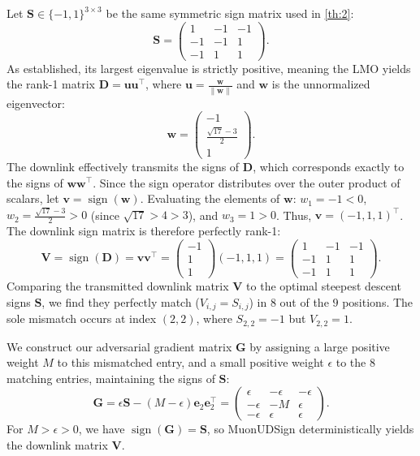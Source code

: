 \documentclass[letterpaper]{article} %
\begin{document}
Let $\mathbf{S} \in \{-1, 1\}^{3 \times 3}$ be the same symmetric sign matrix used in \cref{th:2}:
\begin{equation}
\mathbf{S} = \begin{pmatrix} 1 & -1 & -1 \\ -1 & -1 & 1 \\ -1 & 1 & 1 \end{pmatrix}.
\end{equation}
As established, its largest eigenvalue is strictly positive, meaning the LMO yields the rank-1 matrix $\mathbf{D} = \mathbf{u}\mathbf{u}^\top$, where $\mathbf{u} = \frac{\mathbf{w}}{\|\mathbf{w}\|}$ and $\mathbf{w}$ is the unnormalized eigenvector:
\begin{equation}
\mathbf{w} = \begin{pmatrix} -1 \\ \frac{\sqrt{17}-3}{2} \\ 1 \end{pmatrix}.
\end{equation}
The downlink effectively transmits the signs of $\mathbf{D}$, which corresponds exactly to the signs of $\mathbf{w}\mathbf{w}^\top$. Since the sign operator distributes over the outer product of scalars, let $\mathbf{v} = \operatorname{sign}(\mathbf{w})$.
Evaluating the elements of $\mathbf{w}$: $w_1 = -1 < 0$, $w_2 = \frac{\sqrt{17}-3}{2} > 0$ (since $\sqrt{17} > 4 > 3$), and $w_3 = 1 > 0$. Thus, $\mathbf{v} = (-1, 1, 1)^\top$.
The downlink sign matrix is therefore perfectly rank-1:
\begin{equation}
\mathbf{V} = \operatorname{sign}(\mathbf{D}) = \mathbf{v}\mathbf{v}^\top = \begin{pmatrix} -1 \\ 1 \\ 1 \end{pmatrix} (-1, 1, 1) = \begin{pmatrix} 1 & -1 & -1 \\ -1 & 1 & 1 \\ -1 & 1 & 1 \end{pmatrix}.
\end{equation}
Comparing the transmitted downlink matrix $\mathbf{V}$ to the optimal steepest descent signs $\mathbf{S}$, we find they perfectly match ($V_{i,j} = S_{i,j}$) in $8$ out of the $9$ positions. The sole mismatch occurs at index $(2,2)$, where $S_{2,2} = -1$ but $V_{2,2} = 1$.

We construct our adversarial gradient matrix $\mathbf{G}$ by assigning a large positive weight $M$ to this mismatched entry, and a small positive weight $\epsilon$ to the 8 matching entries, maintaining the signs of $\mathbf{S}$:
\begin{equation}
\mathbf{G} = \epsilon \mathbf{S} - (M - \epsilon) \mathbf{e}_2 \mathbf{e}_2^\top = \begin{pmatrix} \epsilon & -\epsilon & -\epsilon \\ -\epsilon & -M & \epsilon \\ -\epsilon & \epsilon & \epsilon \end{pmatrix}.
\end{equation}
For $M > \epsilon > 0$, we have $\operatorname{sign}(\mathbf{G}) = \mathbf{S}$, so MuonUDSign deterministically yields the downlink matrix $\mathbf{V}$.
\end{document}
